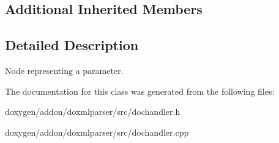 \subsection*{Additional Inherited Members}


\subsection{Detailed Description}
Node representing a parameter. 



The documentation for this class was generated from the following files\+:\begin{DoxyCompactItemize}
\item 
doxygen/addon/doxmlparser/src/dochandler.\+h\item 
doxygen/addon/doxmlparser/src/dochandler.\+cpp\end{DoxyCompactItemize}
